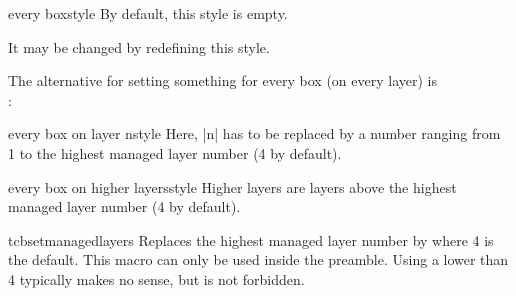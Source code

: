 \begin{docTcbKey}{every box}{}{style}
By default, this style is empty.
\begin{dispListing}
\end{dispListing}
It may be changed by redefining this style.
\begin{dispListing}
\end{dispListing}

\medskip
\begin{marker}
The alternative for setting something for every box (on every layer) is\\
:
\begin{dispListing}
\end{dispListing}
\end{marker}
\end{docTcbKey}

\clearpage
\begin{docTcbKey}{every box on layer n}{}{style}
Here, |n| has to be replaced by a number ranging from 1 to the highest
managed layer number (4 by default).
\begin{dispListing}
\end{dispListing}
\end{docTcbKey}


\begin{docTcbKey}{every box on higher layers}{}{style}
Higher layers are layers above the highest
managed layer number (4 by default).
\begin{dispListing}
\end{dispListing}
\end{docTcbKey}


\begin{docCommand}{tcbsetmanagedlayers}{}
Replaces the highest managed layer number by  where 4 is
the default. This macro can only be used inside the preamble.
Using a  lower than 4 typically makes no sense, but is
not forbidden.
\end{docCommand}


